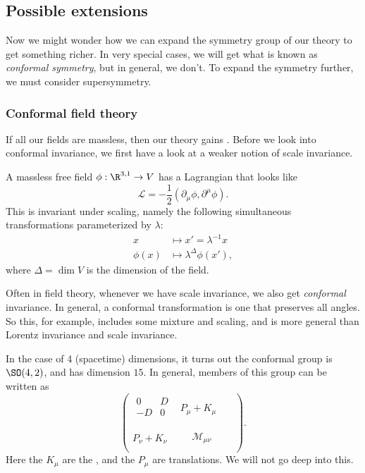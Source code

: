 \documentclass[a4paper]{article}
\begin{document}
\subsection{Possible extensions}
Now we might wonder how we can expand the symmetry group of our theory to get something richer. In very special cases, we will get what is known as \emph{conformal symmetry}, but in general, we don't. To expand the symmetry further, we must consider supersymmetry.
\subsubsection*{Conformal field theory}
If all our fields are massless, then our theory gains . Before we look into conformal invariance, we first have a look at a weaker notion of scale invariance.

A massless free field $\phi: \R^{3, 1} \to V$ has a Lagrangian that looks like
\[
  \mathcal{L} = -\frac{1}{2}(\partial_\mu \phi, \partial^\mu \phi).
\]
This is invariant under scaling, namely the following simultaneous transformations parameterized by $\lambda$:
\begin{align*}
  x &\mapsto x' = \lambda^{-1} x\\
  \phi(x) &\mapsto \lambda^\Delta \phi(x'),
\end{align*}
where $\Delta = \dim V$ is the dimension of the field.

Often in field theory, whenever we have scale invariance, we also get \emph{conformal} invariance. In general, a conformal transformation is one that preserves all angles. So this, for example, includes some mixture and scaling, and is more general than Lorentz invariance and scale invariance.

In the case of 4 (spacetime) dimensions, it turns out the conformal group is $\SO(4, 2)$, and has dimension $15$. In general, members of this group can be written as
\[
  \begin{pmatrix}
    \begin{matrix}
      0 & D\\
      -D & 0\\
    \end{matrix} & P_\mu + K_\mu\\
    P_\nu + K_\nu & \begin{matrix} & & \\ & \mathcal{M}_{\mu\nu} & \\ & & &\end{matrix}
  \end{pmatrix}.
\]
Here the $K_\mu$ are the , and the $P_\mu$ are translations. We will not go deep into this.
\end{document}
